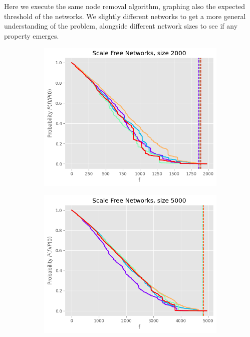 \documentclass[
]{article}
\begin{document}
Here we execute the same node removal algorithm, graphing also the
expected threshold of the networks. We slightly different networks to
get a more general understanding of the problem, alongside different
network sizes to see if any property emerges.

\begin{figure}
  \centering
  \begin{subfigure}{0.3\textwidth}
    \includegraphics{./assets/scalefree_2000_random.png}
  \end{subfigure}
  \begin{subfigure}{0.3\textwidth}
    \includegraphics{./assets/scalefree_5000_random.png}

\end{subfigure}
\end{figure}
\end{document}
